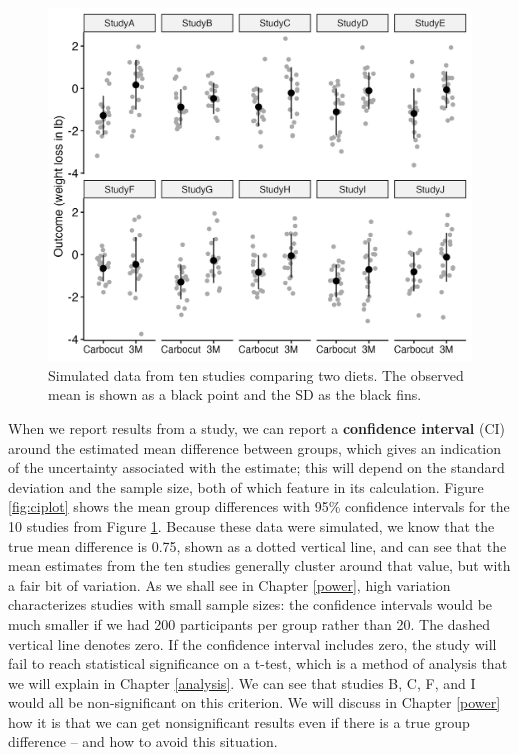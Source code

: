 \documentclass{krantz}
\begin{document}
\begin{figure}
\includegraphics[width=0.9\linewidth]{images_bw/carbo10gp} \caption{Simulated data from ten studies comparing two diets. The observed mean is shown as a black point and the SD as the black fins.}\label{fig:demo-variation2}
\end{figure}

When we report results from a study, we can report a \textbf{confidence interval} (CI) around the estimated mean difference between groups, which gives an indication of the uncertainty associated with the estimate; this will depend on the standard deviation and the sample size, both of which feature in its calculation. Figure \ref{fig:ciplot} shows the mean group differences with 95\% confidence intervals for the 10 studies from Figure \ref{fig:demo-variation2}. Because these data were simulated, we know that the true mean difference is 0.75, shown as a dotted vertical line, and can see that the mean estimates from the ten studies generally cluster around that value, but with a fair bit of variation. As we shall see in Chapter \ref{power}, high variation characterizes studies with small sample sizes: the confidence intervals would be much smaller if we had 200 participants per group rather than 20. The dashed vertical line denotes zero. If the confidence interval includes zero, the study will fail to reach statistical significance on a t-test, which is a method of analysis that we will explain in Chapter \ref{analysis}. We can see that studies B, C, F, and I would all be non-significant on this criterion. We will discuss in Chapter \ref{power} how it is that we can get nonsignificant results even if there is a true group difference -- and how to avoid this situation.
\end{document}
